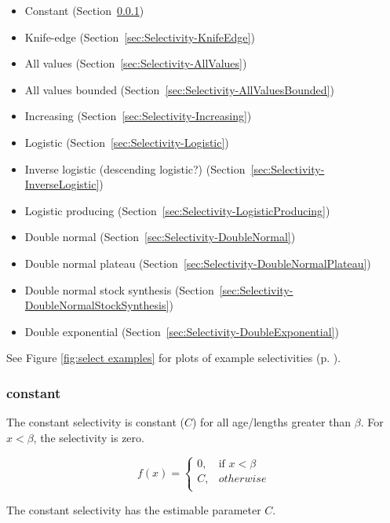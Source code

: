 \begin{itemize}
  \item Constant (Section~\ref{sec:Selectivity-Constant})
  \item Knife-edge (Section~\ref{sec:Selectivity-KnifeEdge})
  \item All values (Section~\ref{sec:Selectivity-AllValues})
  \item All values bounded (Section~\ref{sec:Selectivity-AllValuesBounded})
  \item Increasing (Section~\ref{sec:Selectivity-Increasing})
  \item Logistic (Section~\ref{sec:Selectivity-Logistic})
  \item Inverse logistic (descending logistic?) (Section~\ref{sec:Selectivity-InverseLogistic})
  \item Logistic producing (Section~\ref{sec:Selectivity-LogisticProducing})
  \item Double normal (Section~\ref{sec:Selectivity-DoubleNormal})
  \item Double normal plateau (Section~\ref{sec:Selectivity-DoubleNormalPlateau})
  \item Double normal stock synthesis (Section~\ref{sec:Selectivity-DoubleNormalStockSynthesis})
  \item Double exponential (Section~\ref{sec:Selectivity-DoubleExponential})
\end{itemize}

See Figure \ref{fig:select examples} for plots of example selectivities (p. \pageref{fig:select examples}).

\subsubsection[Constant]{{constant}}\label{sec:Selectivity-Constant}

The constant selectivity is constant ($C$) for all age/lengths greater than $\beta$. For $x < \beta$, the selectivity is zero.

\begin{equation}
f(x)= \begin{cases}
	0, & \text{if $x < \beta$} \\
	C, & otherwise \\
\end{cases}
\end{equation}

The constant selectivity has the estimable parameter $C$.

